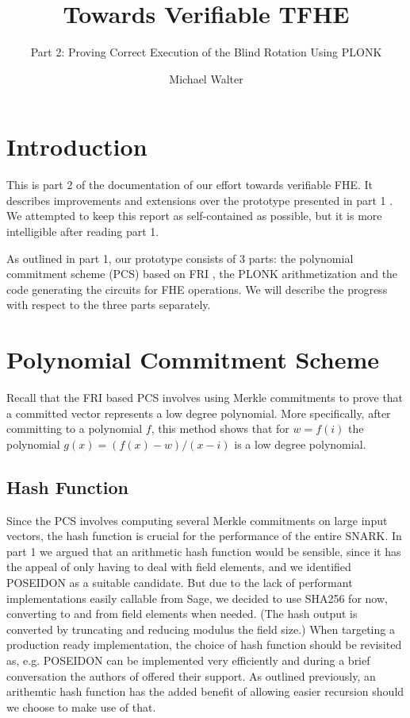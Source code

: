 \documentclass{zamarep}
\title{Towards Verifiable TFHE}
\subtitle{Part 2: Proving Correct Execution of the Blind Rotation Using PLONK}
\author[MW]{Michael Walter}
\begin{document}
\maketitle


\section{Introduction}\label{sec:introduction}
This is part 2 of the documentation of our effort towards verifiable FHE. It describes improvements and extensions over the prototype presented in part 1 \cite{part1}. We attempted to keep this report as self-contained as possible, but it is more intelligible after reading part 1.

As outlined in part 1, our prototype consists of 3 parts: the polynomial commitment scheme (PCS) based on FRI \cite{ICALP:BBHR18}, the PLONK arithmetization \cite{EPRINT:GabWilCio19} and the code generating the circuits for FHE operations. We will describe the progress with respect to the three parts separately.

\section{Polynomial Commitment Scheme}
\label{sec:pcs}
Recall that the FRI based PCS involves using Merkle commitments to prove that a committed vector represents a low degree polynomial. More specifically, after committing to a polynomial $f$, this method shows that for $w = f(i)$ the polynomial $g(x) = (f(x) - w) / (x - i)$ is a low degree polynomial.

\subsection{Hash Function}
\label{sec:hash}
Since the PCS involves computing several Merkle commitments on large input vectors, the hash function is crucial for the performance of the entire SNARK. In part 1 we argued that an arithmetic hash function would be sensible, since it has the appeal of only having to deal with field elements, and we identified POSEIDON \cite{USENIX:GKRRS21} as a suitable candidate. But due to the lack of performant implementations easily callable from Sage, we decided to use SHA256 for now, converting to and from field elements when needed. (The hash output is converted by truncating and reducing modulus the field size.) When targeting a production ready implementation, the choice of hash function should be revisited as, e.g. POSEIDON can be implemented very efficiently and during a brief conversation the authors of \cite{USENIX:GKRRS21} offered their support. As outlined previously, an arithemtic hash function has the added benefit of allowing easier recursion should we choose to make use of that.
\end{document}
